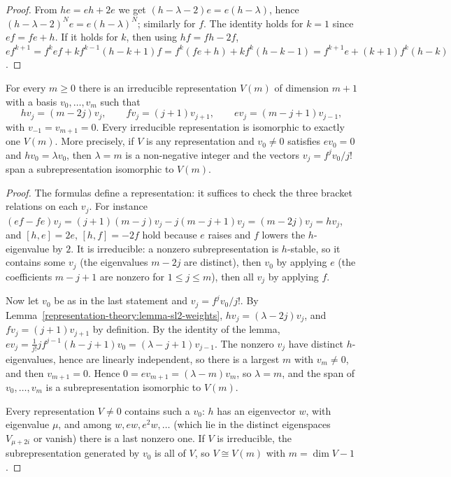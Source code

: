 \begin{proof}
From $he = eh + 2e$ we get $(h - \lambda - 2)e = e(h - \lambda)$, hence $(h - \lambda - 2)^N e = e(h - \lambda)^N$; similarly for $f$.
The identity holds for $k = 1$ since $ef = fe + h$. If it holds for $k$, then using $hf = fh - 2f$,
$ef^{k+1} = f^k e f + kf^{k-1}(h - k + 1)f = f^k(fe + h) + kf^k(h - k - 1) = f^{k+1}e + (k+1)f^k(h - k)$.
\end{proof}

\begin{theorem}\label{representation-theory:theorem-sl2-irreducibles}
For every $m \geq 0$ there is an irreducible representation $V(m)$ of dimension $m + 1$ with a basis
$v_0, \ldots, v_m$ such that
\[
hv_j = (m - 2j)v_j, \qquad fv_j = (j + 1)v_{j+1}, \qquad ev_j = (m - j + 1)v_{j-1},
\]
with $v_{-1} = v_{m+1} = 0$. Every irreducible representation is isomorphic to exactly one $V(m)$. More precisely,
if $V$ is any representation and $v_0 \neq 0$ satisfies $ev_0 = 0$ and $hv_0 = \lambda v_0$, then $\lambda = m$ is a
non-negative integer and the vectors $v_j = f^jv_0/j!$ span a subrepresentation isomorphic to $V(m)$.
\end{theorem}

\begin{proof}
The formulas define a representation: it suffices to check the three bracket relations on each $v_j$. For
instance $(ef - fe)v_j = (j + 1)(m - j)v_j - j(m - j + 1)v_j = (m - 2j)v_j = hv_j$, and $[h, e] = 2e$, $[h, f] = -2f$
hold because $e$ raises and $f$ lowers the $h$-eigenvalue by $2$. It is irreducible: a nonzero subrepresentation
is $h$-stable, so it contains some $v_j$ (the eigenvalues $m - 2j$ are distinct), then $v_0$ by applying $e$
(the coefficients $m - j + 1$ are nonzero for $1 \leq j \leq m$), then all $v_j$ by applying $f$.

Now let $v_0$ be as in the last statement and $v_j = f^jv_0/j!$. By
Lemma~\ref{representation-theory:lemma-sl2-weights}, $hv_j = (\lambda - 2j)v_j$, and $fv_j = (j + 1)v_{j+1}$ by definition.
By the identity of the lemma, $ev_j = \frac{1}{j!}jf^{j-1}(h - j + 1)v_0 = (\lambda - j + 1)v_{j-1}$. The nonzero $v_j$ have
distinct $h$-eigenvalues, hence are linearly independent, so there is a largest $m$ with $v_m \neq 0$, and then
$v_{m+1} = 0$. Hence $0 = ev_{m+1} = (\lambda - m)v_m$, so $\lambda = m$, and the span of $v_0, \ldots, v_m$ is a
subrepresentation isomorphic to $V(m)$.

Every representation $V \neq 0$ contains such a $v_0$: $h$ has an eigenvector $w$, with eigenvalue $\mu$, and among
$w, ew, e^2w, \ldots$ (which lie in the distinct eigenspaces $V_{\mu + 2i}$ or vanish) there is a last nonzero one.
If $V$ is irreducible, the subrepresentation generated by $v_0$ is all of $V$, so $V \cong V(m)$ with
$m = \dim V - 1$.
\end{proof}

